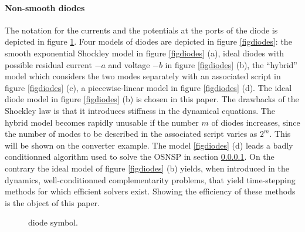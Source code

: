 \documentclass{article}
\begin{document}
\paragraph{Non-smooth  diodes}  The notation for the currents and the potentials at the ports of
the diode is depicted in figure \ref{fig:DIODE}. Four models of diodes are depicted in figure \ref{figdiodes}: the smooth exponential Shockley model in figure \ref{figdiodes} (a), ideal diodes with possible residual current $-a$ and voltage $-b$ in figure \ref{figdiodes} (b), the ``hybrid'' model which considers the two modes separately with an associated script in figure \ref{figdiodes} (c), a piecewise-linear model in figure \ref{figdiodes} (d). The ideal diode model in figure  \ref{figdiodes} (b) is chosen in this paper. The drawbacks of the Shockley law is that it introduces stiffness in the dynamical equations. The hybrid model becomes rapidly unusable if the number $m$ of diodes increases, since the number of modes to be described in the associated script varies as $2^{m}$. This will be shown on the converter example. The model \ref{figdiodes} (d) leads a badly conditionned  algorithm  used to solve the OSNSP in section \ref{}. On the contrary the ideal model of figure  \ref{figdiodes} (b) yields, when introduced in the dynamics, well-conditionned complementarity problems, that yield time-stepping methods for which efficient solvers exist. Showing the efficiency of these methods is the object of this paper.


\begin{figure}
  \centering
  
  \caption{diode symbol.}
  \label{fig:DIODE}
\end{figure}
\end{document}

